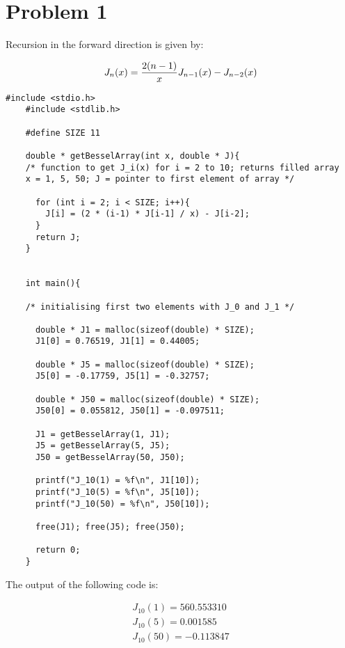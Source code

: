 \documentclass[12pt,letterpaper]{article}
\begin{document}
\section*{Problem 1}

Recursion in the forward direction is given by:

\begin{equation*}
	J_n(x) = {2(n-1)\over{x}}  J_{n-1}(x) - J_{n-2}(x) \\
\end{equation*}


     
    \lstset{language=C++}
    \begin{lstlisting}[style = C]
	#include <stdio.h>
	#include <stdlib.h>
	
	#define SIZE 11
	
	double * getBesselArray(int x, double * J){
	/* function to get J_i(x) for i = 2 to 10; returns filled array
	x = 1, 5, 50; J = pointer to first element of array */

	  for (int i = 2; i < SIZE; i++){
	    J[i] = (2 * (i-1) * J[i-1] / x) - J[i-2];
	  }
	  return J;
	}
	
	
	int main(){
	
	/* initialising first two elements with J_0 and J_1 */
	
	  double * J1 = malloc(sizeof(double) * SIZE);
	  J1[0] = 0.76519, J1[1] = 0.44005;
	
	  double * J5 = malloc(sizeof(double) * SIZE);
	  J5[0] = -0.17759, J5[1] = -0.32757;
	
	  double * J50 = malloc(sizeof(double) * SIZE);
	  J50[0] = 0.055812, J50[1] = -0.097511;
	
	  J1 = getBesselArray(1, J1);
	  J5 = getBesselArray(5, J5);
	  J50 = getBesselArray(50, J50);
	
	  printf("J_10(1) = %f\n", J1[10]);
	  printf("J_10(5) = %f\n", J5[10]);
	  printf("J_10(50) = %f\n", J50[10]);
	
	  free(J1); free(J5); free(J50);
	
	  return 0;
	}

    \end{lstlisting}

The output of the following code is:

\begin{align}
J_{10}(1) = 560.553310 \\
J_{10}(5) = 0.001585 \\
J_{10}(50) = -0.113847
\end{align}
\end{document}
